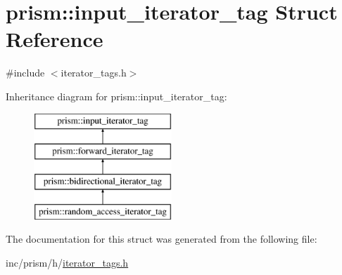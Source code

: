 \hypertarget{structprism_1_1input__iterator__tag}{}\section{prism\+:\+:input\+\_\+iterator\+\_\+tag Struct Reference}
\label{structprism_1_1input__iterator__tag}


{\ttfamily \#include $<$iterator\+\_\+tags.\+h$>$}

Inheritance diagram for prism\+:\+:input\+\_\+iterator\+\_\+tag\+:\begin{figure}[H]
\begin{center}
\leavevmode
\includegraphics[height=4.000000cm]{structprism_1_1input__iterator__tag}
\end{center}
\end{figure}


The documentation for this struct was generated from the following file\+:\begin{DoxyCompactItemize}
\item 
inc/prism/h/\hyperlink{iterator__tags_8h}{iterator\+\_\+tags.\+h}\end{DoxyCompactItemize}
